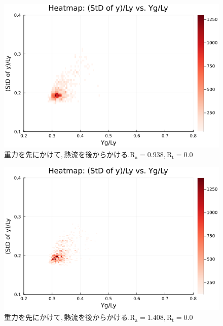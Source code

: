 \begin{figure}[H]
  \centering
  \includegraphics[scale=0.6]{image/RaRtmap_drop_heat/2023-12-21T10:44:57.302_RaRtmap_chi1.265_Ay50_rho0.4_T0.43_dT0.04_Rd0.0_Rt0.0_Ra0.938769_g0.0003999718779659611_run4.0e7.png}
  \caption{$重力を先にかけて, 熱流を後からかける. \text{R}_\text{a}=0.938,\text{R}_\text{t}=0.0$}
  \label{}
\end{figure}

\begin{figure}[H]
  \centering
  \includegraphics[scale=0.6]{image/RaRtmap_drop_heat/2023-12-21T10:44:57.379_RaRtmap_chi1.265_Ay50_rho0.4_T0.43_dT0.04_Rd0.0_Rt0.0_Ra1.4081535_g0.0003999718779659611_run4.0e7.png}
  \caption{$重力を先にかけて, 熱流を後からかける. \text{R}_\text{a}=1.408,\text{R}_\text{t}=0.0$}
  \label{}
\end{figure}

